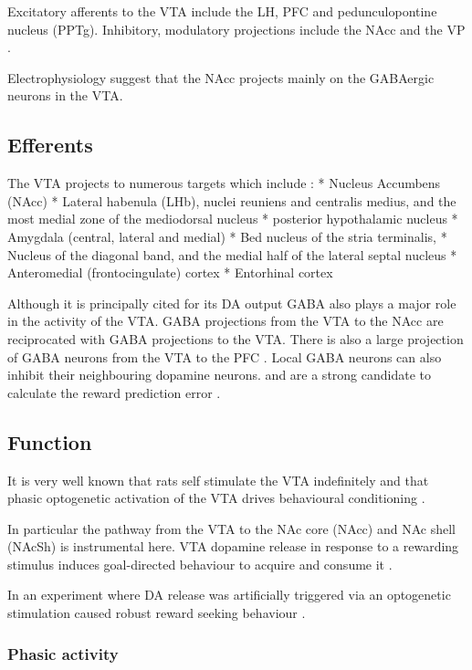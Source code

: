 \documentclass[12pt,a4paper]{article}
\begin{document}
Excitatory afferents to the VTA include the LH, PFC and pedunculopontine nucleus
(PPTg). Inhibitory, modulatory projections include the NAcc and the VP \citep{Sesack2010}.

Electrophysiology suggest that the NAcc projects mainly on the GABAergic neurons in the VTA.

\subsection{Efferents}

The VTA projects to numerous targets which include \citep{Beckstead1979}:
  * Nucleus Accumbens (NAcc)
  * Lateral habenula (LHb), nuclei reuniens and centralis medius, and the most medial zone of the mediodorsal nucleus 
  * posterior hypothalamic nucleus 
  * Amygdala (central, lateral and medial)
  * Bed nucleus of the stria terminalis, 
  * Nucleus of the diagonal band, and the medial half of the lateral septal nucleus
  * Anteromedial (frontocingulate) cortex
  * Entorhinal cortex

Although it is principally cited for its DA output GABA also plays a major role in the activity of the VTA. 
GABA projections from the VTA to the NAcc are reciprocated with GABA projections to the VTA. There is also a large projection of GABA neurons from the VTA to the PFC \citep{Carr2000}. Local GABA neurons can also inhibit their neighbouring dopamine neurons.\citep{Sesack2010} and are a strong candidate to calculate the reward prediction error \citep{Eshel2015}.


\subsection{Function}

It is very well known that rats self stimulate the VTA indefinitely \citep{Stuber2016} and that phasic optogenetic activation of the VTA drives behavioural conditioning \citep{Tsai2009}.

In particular the pathway from the VTA to the NAc core (NAcc) and NAc shell (NAcSh) is instrumental here. VTA dopamine release in response to a rewarding stimulus induces goal-directed behaviour to acquire and consume it \citep{Morales2017}.

In an experiment where DA release was artificially triggered via an optogenetic stimulation caused robust reward seeking behaviour \citep{Steinberg2013}.

\subsubsection{Phasic activity}
\end{document}
